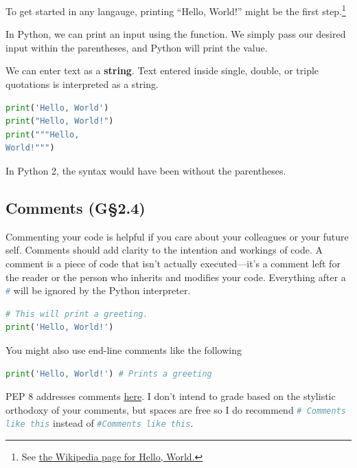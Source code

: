 To get started in any langauge, printing ``Hello, World!'' might be the first step.\footnote{See
\textcolor{blue}{\href{https://en.wikipedia.org/wiki/\%22Hello,_World!\%22_program}
{the Wikipedia page for Hello, World.}}}

In Python, we can print an input using the  function. We simply pass our
desired input within the parentheses, and Python will print the value.

We can enter text as a \textbf{string}. Text entered inside single, double, or triple quotations is interpreted as a string.


\begin{lstlisting}[language = Python]
print('Hello, World')
print("Hello, World!")
print("""Hello,
World!""") \end{lstlisting}


\smallskip
In Python 2, the syntax would have been  without the parentheses.

\subsection{Comments (G\S 2.4)}

Commenting your code is helpful if you care about your colleagues or your future self. Comments should add clarity to
the intention and workings of code. A comment is a piece of code that isn't actually executed---it's a comment left for the reader or the person who inherits and modifies your code.
Everything after a \lstinline[language = Python]{#} will be ignored by the Python interpreter.

\begin{lstlisting}[language = Python]
# This will print a greeting.
print('Hello, World!') \end{lstlisting}

\smallskip
 You might also use end-line comments like the following

\begin{lstlisting}[language = Python]
print('Hello, World!') # Prints a greeting \end{lstlisting}

\smallskip

PEP 8 addresses comments \textcolor{blue}{\href{https://www.python.org/dev/peps/pep-0008/\#comments}{here}}.
I don't intend to grade based on the stylistic orthodoxy of your comments, but spaces are free so I do recommend 
\lstinline[language = Python]{# Comments like this} instead of \lstinline[language = Python]{#Comments like this}.


